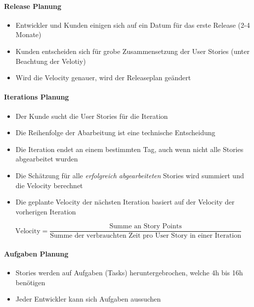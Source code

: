 \documentclass[a4paper, 11pt, accentcolor = tud3b]{tudreport}
\begin{document}
					\paragraph{Release Planung}
						\begin{itemize}
							\item Entwickler und Kunden einigen sich auf ein Datum für das erste Release (2-4 Monate)
							\item Kunden entscheiden sich für grobe Zusammensetzung der User Stories (unter Beachtung der Velotiy)
							\item Wird die Velocity genauer, wird der Releaseplan geändert
						\end{itemize}
					
					\paragraph{Iterations Planung}
						\begin{itemize}
							\item Der Kunde sucht die User Stories für die Iteration
							\item Die Reihenfolge der Abarbeitung ist eine technische Entscheidung
							\item Die Iteration endet an einem bestimmten Tag, auch wenn nicht alle Stories abgearbeitet wurden
							\item Die Schätzung für alle \textit{erfolgreich abgearbeiteten} Stories wird summiert und die Velocity berechnet
							\item Die geplante Velocity der nächsten Iteration basiert auf der Velocity der vorherigen Iteration
						\end{itemize}
						
						\begin{equation*}
							\text{Velocity} = \frac{\text{Summe an Story Points}}{\text{Summe der verbrauchten Zeit pro User Story in einer Iteration}}
						\end{equation*}
					
					\paragraph{Aufgaben Planung}
						\begin{itemize}
							\item Stories werden auf Aufgaben (Tasks) heruntergebrochen, welche 4h bis 16h benötigen
							\item Jeder Entwickler kann sich Aufgaben aussuchen
						\end{itemize}
		
\end{document}
